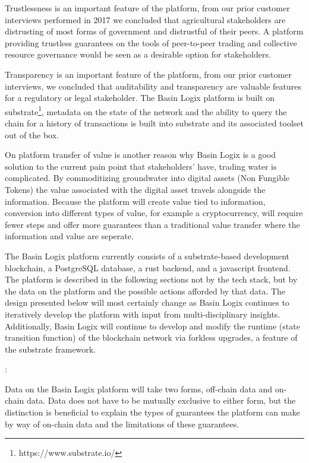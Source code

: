 \documentclass{tufte-handout}
\begin{document}
Trustlessness is an important feature of the platform, from our prior customer interviews performed in 2017 we concluded that agricultural stakeholders are distrusting of most forms of government and distrustful of their peers. A platform providing trustless guarantees on the tools of peer-to-peer trading and collective resource governance would be seen as a desirable option for stakeholders. 

Transparency is an important feature of the platform, from our prior customer interviews, we concluded that auditability and transparency are valuable features for a regulatory or legal stakeholder. The Basin Logix platform is built on substrate\footnote{https://www.substrate.io/}, metadata on the state of the network and the ability to query the chain for a history of transactions is built into substrate and its associated toolset out of the box.   

On platform transfer of value is another reason why Basin Logix is a good solution to the current pain point that stakeholders' have, trading water is complicated. By commoditizing groundwater into digital assets (Non Fungible Tokens) the value associated with the digital asset travels alongside the information. Because the platform will create value tied to information, conversion into different types of value, for example a cryptocurrency, will require fewer steps and offer more guarantees than a traditional value transfer where the information and value are seperate.

The Basin Logix platform currently consists of a substrate-based development blockchain, a PostgreSQL database, a rust backend, and a javascript frontend. The platform is described in the following sections not by the tech stack, but by the data on the platform and the possible actions afforded by that data. The design presented below will most certainly change as Basin Logix continues to iteratively develop the platform with input from multi-disciplinary insights. Additionally, Basin Logix will continue to develop and modify the runtime (state transition function) of the blockchain network via forkless upgrades, a feature of the substrate framework.


:

Data on the Basin Logix platform will take two forms, off-chain data and on-chain data. Data does not have to be mutually exclusive to either form, but the distinction is beneficial to explain the types of guarantees the platform can make by way of on-chain data and the limitations of these guarantees. 
\end{document}

